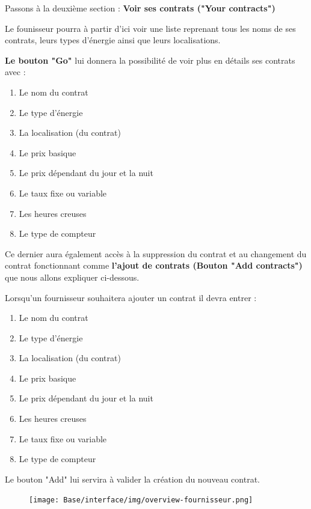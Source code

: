 \newpage

\begin{flushleft}
Passons à la deuxième section : \textbf{Voir ses contrats ("Your contracts")}
\end{flushleft}

\begin{flushleft}
Le founisseur pourra à partir d'ici voir une liste reprenant tous les noms de ses contrats, leurs types d'énergie ainsi que leurs localisations. 
\end{flushleft}

\begin{flushleft}
\textbf{Le bouton "Go"} lui donnera la possibilité de voir plus en détails ses contrats avec :
\end{flushleft}
\begin{enumerate}
\item Le nom du contrat
\item Le type d'énergie
\item La localisation (du contrat)
\item Le prix basique
\item Le prix dépendant du jour et la nuit
\item Le taux fixe ou variable
\item Les heures creuses
\item Le type de compteur
\end{enumerate}

\begin{flushleft}
Ce dernier aura également accès à la suppression du contrat et au changement du contrat fonctionnant comme \textbf{l'ajout de contrats (Bouton "Add contracts")} que nous allons expliquer ci-dessous.
\end{flushleft}

\begin{flushleft}
Lorsqu'un fournisseur souhaitera ajouter un contrat il devra entrer :
\end{flushleft}
\begin{enumerate}
\item Le nom du contrat
\item Le type d'énergie
\item La localisation (du contrat)
\item Le prix basique
\item Le prix dépendant du jour et la nuit
\item Les heures creuses
\item Le taux fixe ou variable
\item Le type de compteur
\end{enumerate}

\begin{flushleft}
Le bouton "Add" lui servira à valider la création du nouveau contrat.
\end{flushleft}

\begin{figure}
    \centering
    \texttt{[image: Base/interface/img/overview-fournisseur.png]}
\end{figure}
